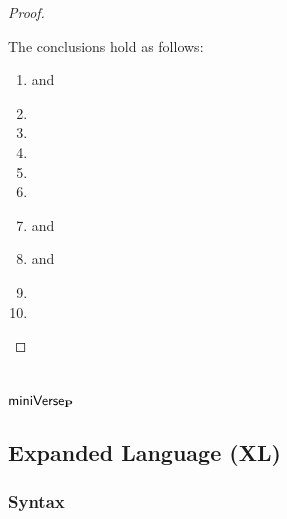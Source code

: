 \begin{grayparbox}
\begin{proof}
\begin{byCases}
    The conclusions hold as follows:
    \begin{enumerate}
      \item {} and 
      \item {}
      \item {}
      \item {}
      \item {}
      \item {}
      \item {} and 
      \item {} and 
      \item {} 
      \item {}
    \end{enumerate}
    \resetpfcounter
\end{byCases}
\end{proof}
\end{grayparbox}


\chapter{\texorpdfstring{$\mathsf{miniVerse}_\textbf{P}$}{miniVerseP}}\label{appendix:miniVerseParam}

\clearpage
\section{Expanded Language (XL)}
\subsection{Syntax}
